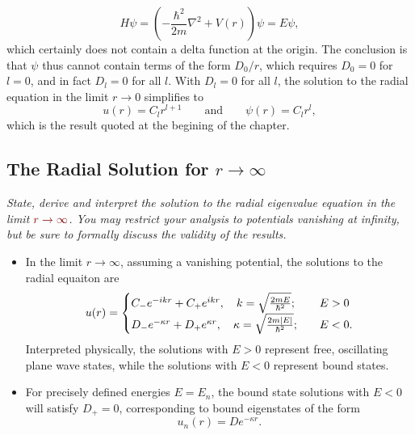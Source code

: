 \documentclass[11pt, a4paper]{article}
\newcommand{\qmath}[1]{\textcolor{Maroon}{#1}}  %
\renewcommand{\laplacian}{\nabla^{2}}
\newcommand{\eqtext}[1]{\qquad \text{#1} \qquad}
\newcommand{\p}{\psi}  %
\begin{document}
\begin{itemize}
    \begin{equation*}
        H \psi = \left( - \frac{\hbar^{2}}{2m}\laplacian + V(r) \right) \psi = E\psi,
    \end{equation*}
    which certainly does not contain a delta function at the origin. The conclusion is that $ \psi $ thus cannot contain terms of the form $ D_{0}/r $, which requires $ D_{0} = 0 $ for $ l = 0 $, and in fact $ D_{l} = 0 $ for all $ l $. With $ D_{l} = 0 $ for all $ l $, the solution to the radial equation in the limit $ r \to 0 $ simplifies to 
	\begin{equation*}
		u(r) = C_{l}r^{l+1} \eqtext{and} \p(r) = C_{l}r^{l},
	\end{equation*}
    which is the result quoted at the begining of the chapter.
	
\end{itemize}

\subsection{The Radial Solution for $ r \to \infty $}
\textit{State, derive and interpret the solution to the radial eigenvalue equation in the limit $ \qmath{r \to \infty} $. You may restrict your analysis to potentials vanishing at infinity, but be sure to formally discuss the validity of the results.}


\begin{itemize}
    \item In the limit $ r \to \infty $, assuming a vanishing potential, the solutions to the radial equaiton are
    \begin{equation*}
        u(r) = 
        \begin{cases}
            C_{-}e^{-ikr} + C_{+}e^{ikr}, \quad k = \sqrt{\frac{2mE}{\hbar^{2}}}; & \quad E > 0\\
            D_{-}e^{-\kappa r} + D_{+}e^{\kappa r}, \quad \kappa = \sqrt{\frac{2m \abs{E}}{\hbar^{2}}}; & \quad E < 0.
        \end{cases}   
    \end{equation*}
    Interpreted physically, the solutions with $ E > 0 $ represent free, oscillating plane wave states, while the solutions with $ E < 0 $ represent bound states. 

    \item For precisely defined energies $ E = E_{n} $, the bound state solutions with $ E < 0 $ will satisfy $ D_{+} = 0 $, corresponding to bound eigenstates of the form
    \begin{equation*}
        u_{n}(r) = D e^{- \kappa r}.
    \end{equation*}
    
    
    
\end{itemize}
\end{document}
